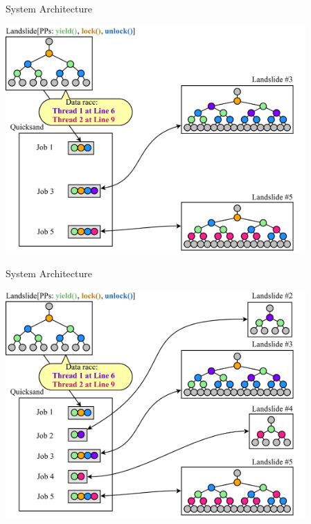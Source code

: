 \documentclass[xcolor=dvipsnames]{beamer}
\begin{document}
\begin{frame}{System Architecture}
	\begin{center}
	\vspace{-0.88em}
	\includegraphics[width=0.86\textwidth]{dr-jobs-3.pdf}
	\end{center}
\end{frame}
\begin{frame}{System Architecture}
	\begin{center}
	\vspace{-0.88em}
	\includegraphics[width=0.86\textwidth]{dr-jobs-4.pdf}
	\end{center}
\end{frame}
\end{document}
